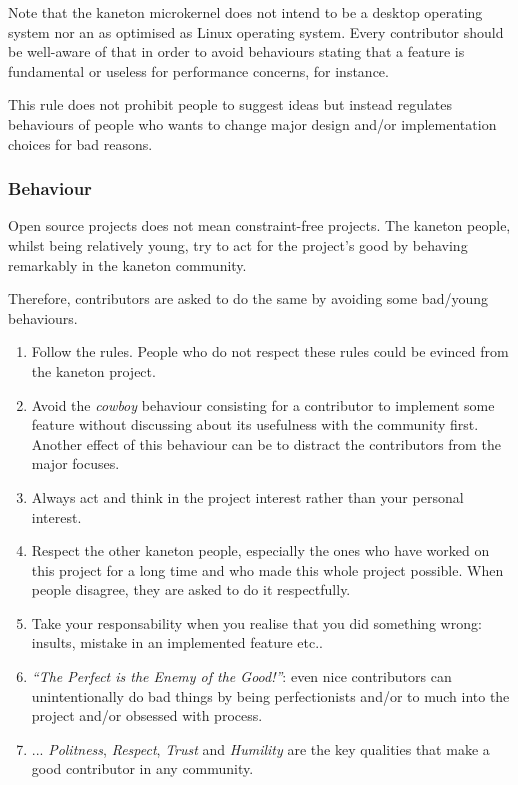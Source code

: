 Note that the kaneton microkernel does not intend to be a desktop operating
system nor an as optimised as Linux operating system. Every contributor should
be well-aware of that in order to avoid behaviours stating that a feature
is fundamental or useless for performance concerns, for instance.

This rule does not prohibit people to suggest ideas but instead regulates
behaviours of people who wants to change major design and/or implementation
choices for bad reasons.


\subsubsection{Behaviour}

Open source projects does not mean constraint-free projects. The kaneton
people, whilst being relatively young, try to act for the project's good
by behaving remarkably in the kaneton community.

Therefore, contributors are asked to do the same by avoiding some bad/young
behaviours.

\begin{enumerate}
  \item
    Follow the rules. People who do not respect these rules could be evinced
    from the kaneton project.
  \item
    Avoid the \textit{cowboy} behaviour consisting for a contributor to
    implement some feature without discussing about its usefulness with the
    community first. Another effect of this behaviour can be to distract
    the contributors from the major focuses.
  \item
    Always act and think in the project interest rather than your personal
    interest.
  \item
    Respect the other kaneton people, especially the ones who have worked
    on this project for a long time and who made this whole project possible.
    When people disagree, they are asked to do it respectfully.
  \item
    Take your responsability when you realise that you did something wrong:
    insults, mistake in an implemented feature etc..
  \item
    \textit{``The Perfect is the Enemy of the Good!''}: even nice
    contributors can unintentionally do bad things by being perfectionists
    and/or to much into the project and/or obsessed with process.
  \item
    ... \textit{Politness}, \textit{Respect}, \textit{Trust} and
    \textit{Humility} are the key qualities that make a good contributor in
    any community.
\end{enumerate}

